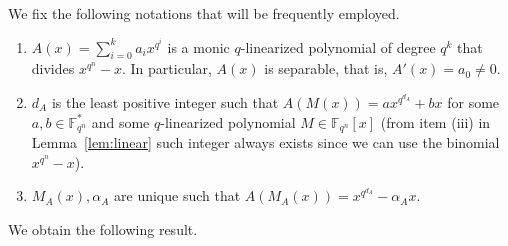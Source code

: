 \documentclass[11pt]{amsart}
\newcommand{\F}{\mathbb{F}}
\theoremstyle{definition}
\theoremstyle{remark}
\begin{document}
We fix the following notations that will be frequently employed.  
\begin{enumerate}
\item $A(x)=\sum_{i=0}^ka_ix^{q^{i}}$ is a monic  $q$-linearized polynomial  of degree $q^k$ that divides $x^{q^n}-x$. In particular, $A(x)$ is  separable, that is, $A'(x)=a_0\neq0$.
\item $d_A$ is the least positive integer such that $A(M(x))=ax^{q^{d_A}}+bx$ for some $a, b\in \F_{q^n}^*$ and some   $q$-linearized polynomial $M\in \F_{q^n}[x]$ (from item (iii) in Lemma~\ref{lem:linear} such integer always exists since we can use the binomial $x^{q^n}-x$).
\item $M_A(x), \alpha_A$ are unique such that $A(M_A(x))=x^{q^{d_A}}-\alpha_{A}x$.

\end{enumerate}


We obtain the following result.
\end{document}
